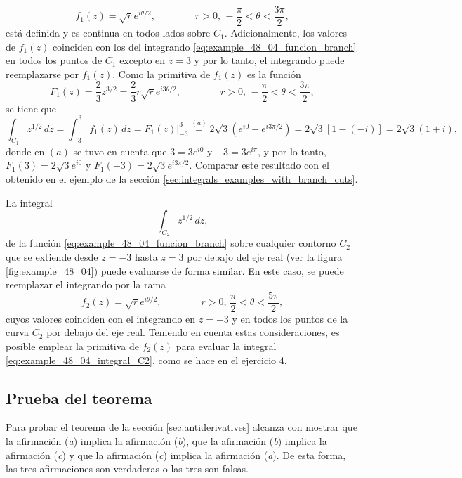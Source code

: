 \documentclass[a4paper]{report}
\begin{document}
\[
 f_1(z)=\sqrt{r}e^{i\theta/2},
 \qquad\qquad
 r>0,\,-\frac{\pi}{2}<\theta<\frac{3\pi}{2},
\]
está definida y es continua en todos lados sobre \(C_1\). Adicionalmente, los valores de \(f_1(z)\) coinciden con los del integrando \ref{eq:example_48_04_funcion_branch} en todos los puntos de \(C_1\) excepto en \(z=3\) y por lo tanto, el integrando puede reemplazarse por \(f_1(z)\). Como la primitiva de \(f_1(z)\) es la función 
\[
 F_1(z)=\frac{2}{3}z^{3/2}=\frac{2}{3}r\sqrt{r}e^{i3\theta/2},
 \qquad\qquad
 r>0,\,-\frac{\pi}{2}<\theta<\frac{3\pi}{2},
\]
se tiene que 
\begin{equation}\label{eq:example_48_04_integral_C1}
 \int_{C_1}z^{1/2}\,dz=\int_{-3}^3f_1(z)\,dz=F_1(z)\bigg|_{-3}^3\overset{(a)}{=}2\sqrt{3}(e^{i0}-e^{i3\pi/2})
 =2\sqrt{3}[1-(-i)]=2\sqrt{3}(1+i), 
\end{equation}
donde en \((a)\) se tuvo en cuenta que \(3=3e^{i0}\) y \(-3=3e^{i\pi}\), y por lo tanto, \(F_1(3)=2\sqrt{3}e^{i0}\) y \(F_1(-3)=2\sqrt{3}e^{i3\pi/2}\). Comparar este resultado  con el obtenido en el ejemplo de la sección \ref{sec:integrals_examples_with_branch_cuts}.

La integral 
\begin{equation}\label{eq:example_48_04_integral_C2}
 \int_{C_2}z^{1/2}\,dz, 
\end{equation}
de la función \ref{eq:example_48_04_funcion_branch} sobre cualquier contorno \(C_2\) que se extiende desde \(z=-3\) hasta \(z=3\) por debajo del eje real (ver la figura \ref{fig:example_48_04}) puede evaluarse de forma similar. En este caso, se puede reemplazar el integrando por la rama 
\[
 f_2(z)=\sqrt{r}e^{i\theta/2},
 \qquad\qquad
 r>0,\,\frac{\pi}{2}<\theta<\frac{5\pi}{2},
\]
cuyos valores coinciden con el integrando en \(z=-3\) y en todos los puntos de la curva \(C_2\) por debajo del eje real. Teniendo en cuenta estas consideraciones, es posible emplear la primitiva de \(f_2(z)\) para evaluar la integral \ref{eq:example_48_04_integral_C2}, como se hace en el ejercicio 4. 

\subsection*{Prueba del teorema}

Para probar el teorema de la sección \ref{sec:antiderivatives} alcanza con mostrar que la afirmación (\textit{a}) implica la afirmación (\textit{b}), que la afirmación (\textit{b}) implica la afirmación (\textit{c}) y que la afirmación (\textit{c}) implica la afirmación (\textit{a}). De esta forma, las tres afirmaciones son verdaderas o las tres son falsas.
\end{document}

